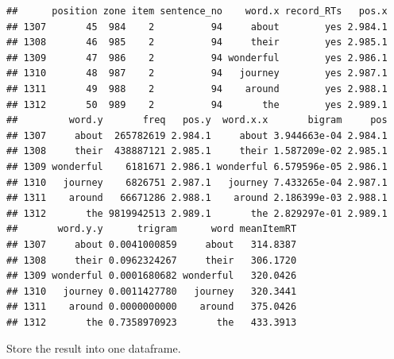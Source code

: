 \documentclass{article}\usepackage[]{graphicx}\usepackage[]{color}
\makeatletter
\newenvironment{kframe}{%
 \def\at@end@of@kframe{}%
 \ifinner\ifhmode%
  \def\at@end@of@kframe{\end{minipage}}%
  \begin{minipage}{\columnwidth}%
 \fi\fi%
 \def\FrameCommand##1{\hskip\@totalleftmargin \hskip-\fboxsep
 \colorbox{shadecolor}{##1}\hskip-\fboxsep
     \hskip-\linewidth \hskip-\@totalleftmargin \hskip\columnwidth}%
 \MakeFramed {\advance\hsize-\width
   \@totalleftmargin\z@ \linewidth\hsize
   \@setminipage}}%
 {\par\unskip\endMakeFramed%
 \at@end@of@kframe}
\newenvironment{knitrout}{}{} %
\makeatother
\begin{document}
\begin{knitrout}
\begin{kframe}
\begin{alltt}
\end{alltt}
\begin{verbatim}
##      position zone item sentence_no    word.x record_RTs   pos.x
## 1307       45  984    2          94     about        yes 2.984.1
## 1308       46  985    2          94     their        yes 2.985.1
## 1309       47  986    2          94 wonderful        yes 2.986.1
## 1310       48  987    2          94   journey        yes 2.987.1
## 1311       49  988    2          94    around        yes 2.988.1
## 1312       50  989    2          94       the        yes 2.989.1
##         word.y       freq   pos.y  word.x.x       bigram     pos
## 1307     about  265782619 2.984.1     about 3.944663e-04 2.984.1
## 1308     their  438887121 2.985.1     their 1.587209e-02 2.985.1
## 1309 wonderful    6181671 2.986.1 wonderful 6.579596e-05 2.986.1
## 1310   journey    6826751 2.987.1   journey 7.433265e-04 2.987.1
## 1311    around   66671286 2.988.1    around 2.186399e-03 2.988.1
## 1312       the 9819942513 2.989.1       the 2.829297e-01 2.989.1
##       word.y.y      trigram      word meanItemRT
## 1307     about 0.0041000859     about   314.8387
## 1308     their 0.0962324267     their   306.1720
## 1309 wonderful 0.0001680682 wonderful   320.0426
## 1310   journey 0.0011427780   journey   320.3441
## 1311    around 0.0000000000    around   375.0426
## 1312       the 0.7358970923       the   433.3913
\end{verbatim}
\end{kframe}
\end{knitrout}

Store the result into one dataframe.
\end{document}
